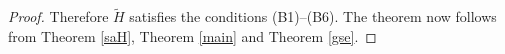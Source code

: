 \documentclass[12pt,draft]{article}
\theoremstyle{plain}
\newtheorem{theorem}{Theorem}[section]
\numberwithin{equation}{section}
\theoremstyle{remark}
\begin{document}
\begin{proof}
Therefore $\tilde{H}$ satisfies the conditions (B1)--(B6).
The theorem now follows from Theorem \ref{saH}, Theorem \ref{main} and Theorem \ref{gse}.
\end{proof}



\begin{comment}
\subsection{A Model of  a Harmonic Oscillator Coupled to a Bose Field with the Spring Constant Renormalization}

We continue to study the Hamiltonian $H$ defined in Subsection \ref{ho+bose}.
We consider a perturbation of $H$ by adding a term $R$, which corresponds to the spring constant renormalization:
\[
H':=H+R,\ \ \ \ \ R:=\frac{\lambda^2\|T^{-1/2}g\|^2}{2}x^2\otimes1.
\]
The Hamiltonian $H'$ was investigated in \cite{Ar81}.
This perturbation allows us to diagonalize $H'$ for an arbitrary coupling constant $\lambda\in\RR$.

\begin{theorem}
The Hamiltonian $H'$ is essentially self-adjoint, and there are unitary operator 
$U:L^2(\RR,dx)\otimes\Fb(\sH)\to\Fb(\CC\oplus\sH)$ and a real constant $E\in\RR$ such that 
\[
UH'U^*={\rm d}\Gamma_{\rm b}\left(\sqrt{\gamma(\beta+\lambda^2\|T^{-1/2}g\|^2)\oplus T^2+W}\right) + E,
\]
where $W$ is a finite rank operator on $\CC\oplus\sH$ defined by
\[
W:=
\begin{pmatrix}
0 & \gamma^{1/2}\lambda|1\rangle\langle T^{1/2}g| \\
\gamma^{1/2}\lambda |T^{1/2}g\rangle\langle 1| & 0
\end{pmatrix}.
\]
\end{theorem}

\begin{proof}
Since
\[
H'=\left\{\frac{\gamma}{2}p^2+\frac{\beta+\lambda^2\|T^{-1/2}g\|^2}{2}x^2\right\}\otimes1 +1\otimes \dGb(T) + \lambda x\otimes\Phi_{\rm S}(g),
\]
the theorem follows from Theorem \ref{ho+boson diag}.
\end{proof}
\end{comment}
\end{document}
